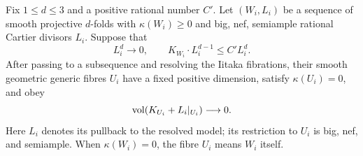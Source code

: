 \begin{lemma}\label{lem:scalar-iitaka-volume}
Fix $1\le d\le3$ and a positive rational number $C'$.  Let
$(W_i,L_i)$ be a sequence of smooth projective $d$-folds with
$\kappa(W_i)\ge0$ and big, nef, semiample rational Cartier divisors $L_i$.
Suppose that
\begin{equation}\label{eq:scalar-fibre-hypotheses}
 L_i^d\longrightarrow0,
 \qquad K_{W_i}\cdot L_i^{d-1}\le C'L_i^d.
\end{equation}
After passing to a subsequence and resolving the Iitaka fibrations,
their smooth geometric generic fibres $U_i$ have a fixed positive
dimension, satisfy $\kappa(U_i)=0$, and obey
\[
 \operatorname{vol}(K_{U_i}+L_i|_{U_i})\longrightarrow0.
\]
Here $L_i$ denotes its pullback to the resolved model; its restriction
to $U_i$ is big, nef, and semiample.  When $\kappa(W_i)=0$, the fibre
$U_i$ means $W_i$ itself.
\end{lemma}

